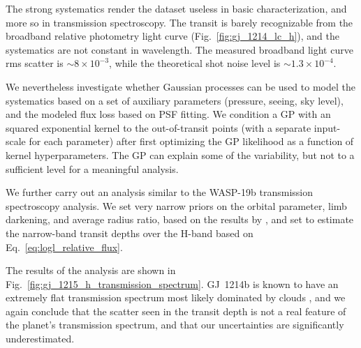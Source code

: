 \documentclass[useAMS,usenatbib]{mn2e}
\begin{document}
The strong systematics render the dataset useless in basic characterization, and more so in transmission spectroscopy. 
The transit is barely recognizable from the broadband relative photometry light curve (Fig.~\ref{fig:gj_1214_lc_h}), 
and the systematics are not constant in wavelength. The measured broadband light curve rms scatter is
$\sim 8\times10^{-3}$, while the theoretical shot noise level is $\sim 1.3\times10^{-4}$.

We nevertheless investigate whether Gaussian processes \citep{Gibson2011a,Roberts2013,Rasmussen2006} can be used to 
model the systematics based on a set of auxiliary parameters (pressure, seeing, sky level), and the modeled flux loss 
based on PSF fitting. We condition a GP with an squared exponential kernel to the out-of-transit points (with a 
separate input-scale for each parameter) after first optimizing the GP likelihood as a function of kernel 
hyperparameters. The GP can explain some of the variability, but not to a sufficient level for a meaningful analysis.

We further carry out an analysis similar to the WASP-19b transmission spectroscopy analysis. We set very narrow 
priors on the orbital parameter, limb darkening, and average radius ratio, based on the results by 
\citet{Kreidberg2013}, and set to estimate the narrow-band transit depths over the H-band based on 
Eq.~\ref{eq:logl_relative_flux}. 

The results of the analysis are shown in Fig.~\ref{fig:gj_1215_h_transmission_spectrum}. GJ~1214b is known to have an
extremely flat transmission spectrum most likely dominated by clouds \citep{Kreidberg2013}, and we again conclude that 
the scatter seen in the transit depth is not a real feature of the planet's transmission spectrum, and that our 
uncertainties are significantly underestimated.
\end{document}
